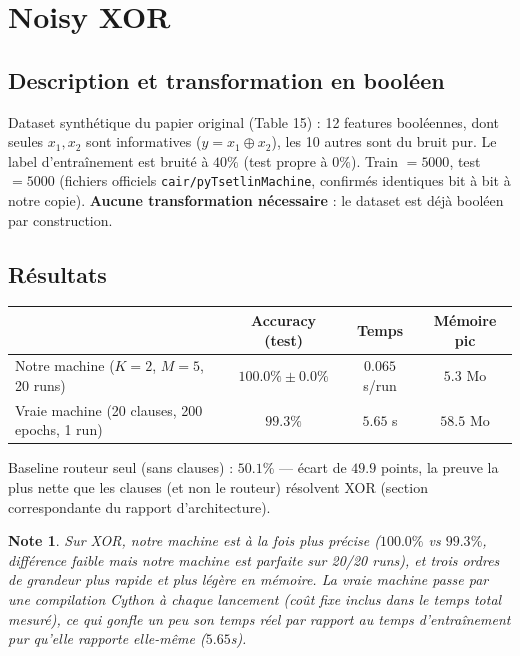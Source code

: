 \documentclass[12pt,a4paper]{article}
\newcommand{\code}[1]{\texttt{#1}}
\theoremstyle{plain}
\newtheorem{note}{Note}[section]
\begin{document}
\section{Noisy XOR}

\subsection{Description et transformation en bool\'een}

Dataset synth\'etique du papier original (Table 15) : 12 features bool\'eennes, dont seules $x_1,x_2$ sont informatives ($y = x_1 \oplus x_2$), les 10 autres sont du bruit pur. Le label d'entra\^inement est bruit\'e \`a $40\%$ (test propre \`a $0\%$). Train $=5000$, test $=5000$ (fichiers officiels \code{cair/pyTsetlinMachine}, confirm\'es identiques bit \`a bit \`a notre copie). \textbf{Aucune transformation n\'ecessaire} : le dataset est d\'ej\`a bool\'een par construction.

\subsection{R\'esultats}

\begin{center}
\renewcommand{\arraystretch}{1.3}
\begin{tabular}{lccc}
\toprule
 & \textbf{Accuracy (test)} & \textbf{Temps} & \textbf{M\'emoire pic} \\
\midrule
Notre machine ($K{=}2$, $M{=}5$, 20 runs)      & $100.0\% \pm 0.0\%$ & $0.065$ s/run   & $5.3$ Mo \\
Vraie machine (20 clauses, 200 epochs, 1 run)  & $99.3\%$            & $5.65$ s        & $58.5$ Mo \\
\bottomrule
\end{tabular}
\end{center}

\noindent\footnotesize Baseline routeur seul (sans clauses) : $50.1\%$ --- \'ecart de $49.9$ points, la preuve la plus nette que les clauses (et non le routeur) r\'esolvent XOR (section correspondante du rapport d'architecture).\normalsize

\begin{note}
Sur XOR, notre machine est \`a la fois plus pr\'ecise ($100.0\%$ vs $99.3\%$, diff\'erence faible mais notre machine est parfaite sur 20/20 runs), et trois ordres de grandeur plus rapide et plus l\'eg\`ere en m\'emoire. La vraie machine passe par une compilation Cython \`a chaque lancement (co\^ut fixe inclus dans le temps total mesur\'e), ce qui gonfle un peu son temps r\'eel par rapport au temps d'entra\^inement pur qu'elle rapporte elle-m\^eme ($5.65$s).
\end{note}
\end{document}
